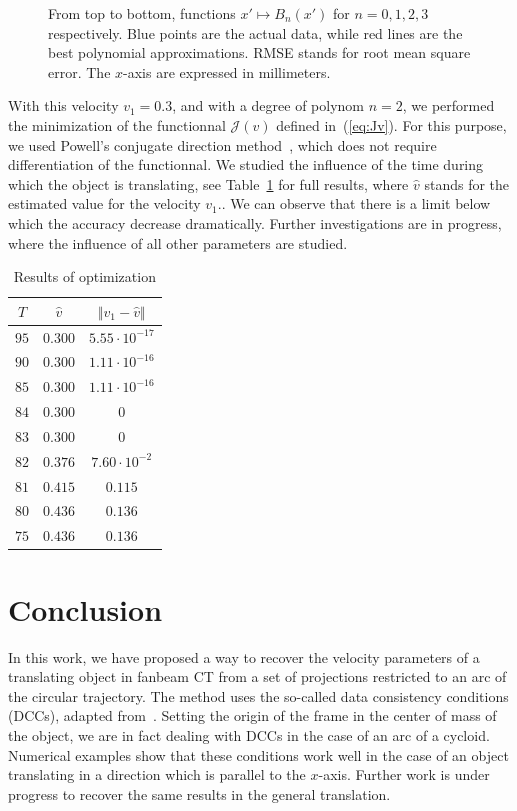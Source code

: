 \documentclass[twocolumn]{IEEEtran}
\numberwithin{equation}{section}
\begin{document}
\begin{figure}
\begin{tabular}{cc}
	\end{tabular}
	\caption{From top to bottom, functions $x' \mapsto B_n(x')$ for $n = 0,1,2,3$ respectively. Blue points are the actual data, while red lines are the best polynomial approximations. RMSE stands for root mean square error. The $x$-axis are expressed in millimeters.\label{fig:Bnx}}
\end{figure}

With this velocity $v_1 = 0.3$, and with a degree of polynom $n = 2$, we performed the minimization of the functionnal $\mathcal{J}(v)$ defined in~(\ref{eq:Jv}). For this purpose, we used Powell's conjugate direction method~\cite{powell1964efficient}, which does not require differentiation of the functionnal. We studied the influence of the time during which the object is translating, see Table~\ref{tab:results} for full results, where $\hat{v}$ stands for the estimated value for the velocity $v_1$.. We can observe that there is a limit below which the accuracy decrease dramatically. Further investigations are in progress, where the influence of all other parameters are studied.

\begin{table}[!ht]
\caption{Results of optimization \label{tab:results}}
\centering
	\begin{tabular}{c|c|c}
	  $T$ & $\hat{v}$ & $\Vert v_1 - \hat{v}\Vert$ \\
	  \hline
		$95$ & $0.30$0 & $5.55 \cdot 10^{-17}$ \\
		$90$ & $0.300$ & $1.11 \cdot 10^{-16}$ \\
		$85$ & $0.300$ & $1.11 \cdot 10^{-16}$ \\
		$84$ & $0.300$ & $0$ \\
		$83$ & $0.300$ & $0$ \\
		$82$ & $0.376$ & $7.60 \cdot 10^{-2}$ \\
		$81$ & $0.415$ & $0.115$ \\
		$80$ & $0.436$ & $0.136$ \\
		$75$ & $0.436$ & $0.136$
\end{tabular}
\end{table}


\section{Conclusion}
In this work, we have proposed a way to recover the velocity parameters of a translating object in fanbeam CT from a set of projections restricted to an arc of the circular trajectory. The method uses the so-called data consistency conditions (DCCs), adapted from~\cite{clackdoyle2015consistency}. Setting the origin of the frame in the center of mass of the object, we are in fact dealing with DCCs in the case of an arc of a cycloid. Numerical examples show that these conditions work well in the case of an object translating in a direction which is parallel to the $x$-axis. Further work is under progress to recover the same results in the general translation.




\end{document}
